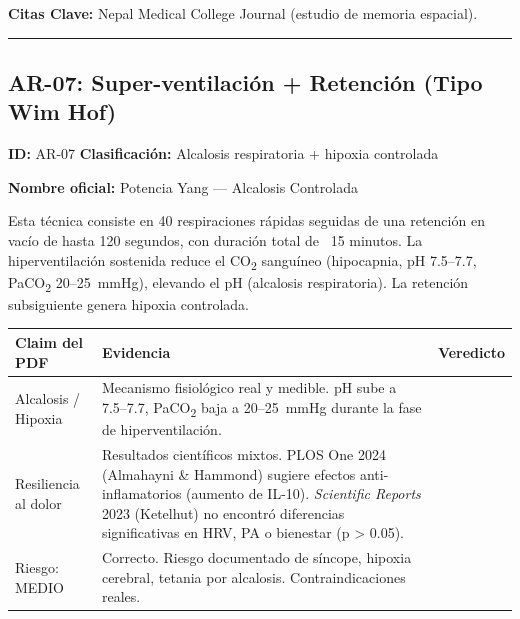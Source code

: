 \documentclass[12pt,a4paper]{article}
\newcommand{\veredicto}[1]{%
    \ifthenelse{\equal{#1}{fuerte}}{\textcolor{verde}{\textbf{✅ FUERTE}}}{%
    \ifthenelse{\equal{#1}{moderado}}{\textcolor{amarillo}{\textbf{⚠️ MODERADO}}}{%
    \ifthenelse{\equal{#1}{parcial}}{\textcolor{amarillo}{\textbf{⚠️ PARCIAL}}}{%
    \ifthenelse{\equal{#1}{sinrespaldo}}{\textcolor{rojo}{\textbf{❌ SIN RESPALDO}}}{%
    \ifthenelse{\equal{#1}{exagerado}}{\textcolor{rojo}{\textbf{❌ EXAGERADO}}}{#1}}}}}
}
\begin{document}
\textbf{Citas Clave:} Nepal Medical College Journal (estudio de memoria espacial).

\bigskip
\rule{\textwidth}{0.4pt}

\subsection*{AR-07: Super-ventilación + Retención (Tipo Wim Hof)}

\textbf{ID:} AR-07 \hfill \textbf{Clasificación:} Alcalosis respiratoria + hipoxia controlada

\vspace{0.1cm}
\textbf{Nombre oficial:} Potencia Yang — Alcalosis Controlada

\vspace{0.2cm}
Esta técnica consiste en 40 respiraciones rápidas seguidas de una retención
en vacío de hasta 120 segundos, con duración total de ~15 minutos. La
hiperventilación sostenida reduce el CO\textsubscript{2} sanguíneo (hipocapnia,
pH 7.5--7.7, PaCO\textsubscript{2} 20--25~mmHg), elevando el pH (alcalosis
respiratoria). La retención subsiguiente genera hipoxia controlada.

\vspace{0.2cm}
\begin{tabularx}{\textwidth}{lXc}
\toprule
\textbf{Claim del PDF} & \textbf{Evidencia} & \textbf{Veredicto} \\
\midrule
Alcalosis / Hipoxia & Mecanismo fisiológico real y medible. pH sube a 7.5--7.7,
                      PaCO\textsubscript{2} baja a 20--25~mmHg durante la fase
                      de hiperventilación. & \veredicto{fuerte} \\
Resiliencia al dolor & Resultados científicos mixtos. PLOS One 2024 (Almahayni
                       \& Hammond) sugiere efectos anti-inflamatorios (aumento
                       de IL-10). \textit{Scientific Reports} 2023 (Ketelhut)
                       no encontró diferencias significativas en HRV, PA o
                       bienestar (p > 0.05). & \veredicto{parcial} \\
Riesgo: MEDIO & Correcto. Riesgo documentado de síncope, hipoxia cerebral,
                tetania por alcalosis. Contraindicaciones reales. &
                \veredicto{fuerte} \\
\bottomrule
\end{tabularx}
\end{document}
